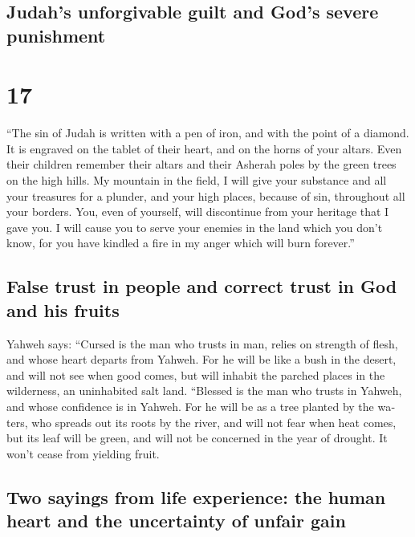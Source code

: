\begin{paracol}{2}
\begin{otherlanguage}{english}
{\subsection{Judah's unforgivable guilt and God's severe
punishment}\label{judahs-unforgivable-guilt-and-gods-severe-punishment}}

\hypertarget{section-33}{%
\section{17}\label{section-33}}

 ``The sin of Judah is written with a pen of iron, and
with the point of a diamond. It is engraved on the tablet of their
heart, and on the horns of your altars.  Even their
children remember their altars and their Asherah poles by the green
trees on the high hills.  My mountain in the field, I will
give your substance and all your treasures for a plunder, and your high
places, because of sin, throughout all your borders.  You,
even of yourself, will discontinue from your heritage that I gave you. I
will cause you to serve your enemies in the land which you don't know,
for you have kindled a fire in my anger which will burn forever.''

\hypertarget{false-trust-in-people-and-correct-trust-in-god-and-his-fruits}{%
\subsection{False trust in people and correct trust in God and his
fruits}\label{false-trust-in-people-and-correct-trust-in-god-and-his-fruits}}

 Yahweh says: ``Cursed is the man who trusts in man,
relies on strength of flesh, and whose heart departs from Yahweh.
 For he will be like a bush in the desert, and will not
see when good comes, but will inhabit the parched places in the
wilderness, an uninhabited salt land.  ``Blessed is the
man who trusts in Yahweh, and whose confidence is in Yahweh.
 For he will be as a tree planted by the waters, who
spreads out its roots by the river, and will not fear when heat comes,
but its leaf will be green, and will not be concerned in the year of
drought. It won't cease from yielding fruit.

\hypertarget{two-sayings-from-life-experience-the-human-heart-and-the-uncertainty-of-unfair-gain}{%
\subsection{Two sayings from life experience: the human heart and the
uncertainty of unfair
gain}\label{two-sayings-from-life-experience-the-human-heart-and-the-uncertainty-of-unfair-gain}}


\end{otherlanguage}
\end{paracol}
